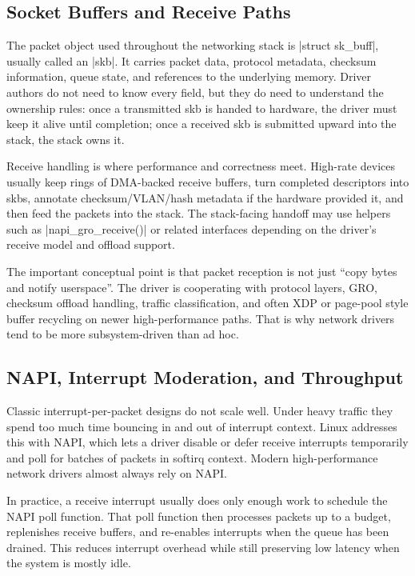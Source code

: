 \documentclass[10pt, oneside]{book}
\begin{document}
\subsection{Socket Buffers and Receive Paths}
\label{sec:skb}
The packet object used throughout the networking stack is \cpp|struct sk_buff|,
usually called an \cpp|skb|.
It carries packet data, protocol metadata, checksum information, queue state,
and references to the underlying memory.
Driver authors do not need to know every field, but they do need to understand
the ownership rules: once a transmitted skb is handed to hardware, the driver
must keep it alive until completion; once a received skb is submitted upward
into the stack, the stack owns it.

Receive handling is where performance and correctness meet.
High-rate devices usually keep rings of DMA-backed receive buffers, turn
completed descriptors into skbs, annotate checksum/VLAN/hash metadata if the
hardware provided it, and then feed the packets into the stack.
The stack-facing handoff may use helpers such as \cpp|napi_gro_receive()| or
related interfaces depending on the driver's receive model and offload support.

The important conceptual point is that packet reception is not just ``copy bytes
and notify userspace''.
The driver is cooperating with protocol layers, GRO, checksum offload handling,
traffic classification, and often XDP or page-pool style buffer recycling on
newer high-performance paths.
That is why network drivers tend to be more subsystem-driven than ad hoc.

\subsection{NAPI, Interrupt Moderation, and Throughput}
\label{sec:napi}
Classic interrupt-per-packet designs do not scale well.
Under heavy traffic they spend too much time bouncing in and out of interrupt
context.
Linux addresses this with NAPI, which lets a driver disable or defer receive
interrupts temporarily and poll for batches of packets in softirq context.
Modern high-performance network drivers almost always rely on NAPI.

In practice, a receive interrupt usually does only enough work to schedule the
NAPI poll function.
That poll function then processes packets up to a budget, replenishes receive
buffers, and re-enables interrupts when the queue has been drained.
This reduces interrupt overhead while still preserving low latency when the
system is mostly idle.
\end{document}
